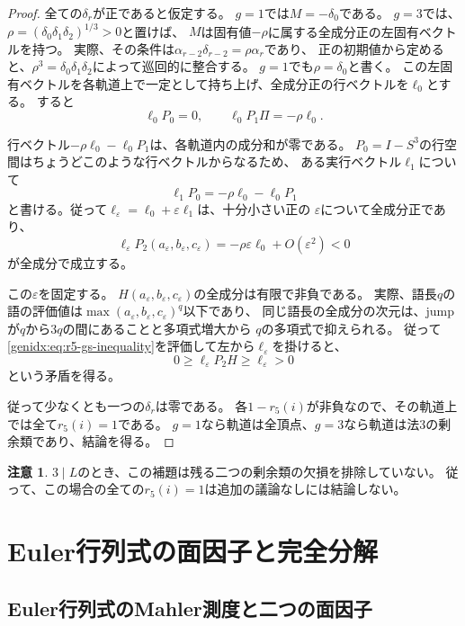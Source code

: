 \documentclass[11pt,a4paper]{ltjsarticle}
\theoremstyle{definition}
\newtheorem{remark}[theorem]{注意}
\begin{document}
\begin{proof}
全ての$\delta_r$が正であると仮定する。
$g=1$では$M=-\delta_0$である。
$g=3$では、$\rho=(\delta_0\delta_1\delta_2)^{1/3}>0$と置けば、
$M$は固有値$-\rho$に属する全成分正の左固有ベクトルを持つ。
実際、その条件は$\alpha_{r-2}\delta_{r-2}=\rho\alpha_r$であり、
正の初期値から定めると、$\rho^3=\delta_0\delta_1\delta_2$によって巡回的に整合する。
$g=1$でも$\rho=\delta_0$と書く。
この左固有ベクトルを各軌道上で一定として持ち上げ、全成分正の行ベクトルを$\ell_0$とする。
すると
\[
\ell_0P_0=0,\qquad \ell_0P_1\Pi=-\rho\ell_0.
\]

行ベクトル$-\rho\ell_0-\ell_0P_1$は、各軌道内の成分和が零である。
$P_0=I-S^3$の行空間はちょうどこのような行ベクトルからなるため、
ある実行ベクトル$\ell_1$について
\[
\ell_1P_0=-\rho\ell_0-\ell_0P_1
\]
と書ける。従って$\ell_\varepsilon=\ell_0+\varepsilon\ell_1$は、十分小さい正の
$\varepsilon$について全成分正であり、
\[
\ell_\varepsilon P_2(a_\varepsilon,b_\varepsilon,c_\varepsilon)
=-\rho\varepsilon\ell_0+O(\varepsilon^2)<0
\]
が全成分で成立する。

この$\varepsilon$を固定する。
$H(a_\varepsilon,b_\varepsilon,c_\varepsilon)$の全成分は有限で非負である。
実際、語長$q$の語の評価値は$\max(a_\varepsilon,b_\varepsilon,c_\varepsilon)^q$以下であり、
同じ語長の全成分の次元は、jumpが$q$から$3q$の間にあることと多項式増大から
$q$の多項式で抑えられる。
従って\eqref{genidx:eq:r5-gs-inequality}を評価して左から$\ell_\varepsilon$を掛けると、
\[
0\ge\ell_\varepsilon P_2H\ge\ell_\varepsilon>0
\]
という矛盾を得る。

従って少なくとも一つの$\delta_r$は零である。
各$1-r_5(i)$が非負なので、その軌道上では全て$r_5(i)=1$である。
$g=1$なら軌道は全頂点、$g=3$なら軌道は法3の剰余類であり、結論を得る。
\end{proof}

\begin{remark}
$3\mid L$のとき、この補題は残る二つの剰余類の欠損を排除していない。
従って、この場合の全ての$r_5(i)=1$は追加の議論なしには結論しない。
\end{remark}




\section{Euler行列式の面因子と完全分解}\label{sec:euler-factors}
\subsection{Euler行列式のMahler測度と二つの面因子}
\label{mahler:sec:euler-faces}
\end{document}
